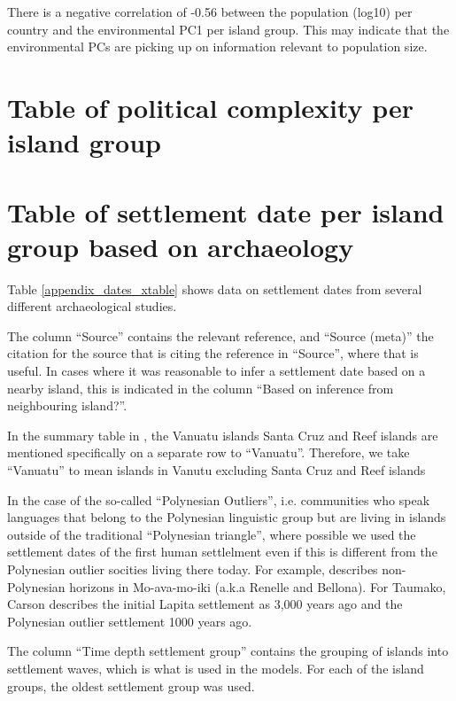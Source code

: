\documentclass[unnumsec,webpdf,modern,medium]{oup-authoring-template}
\begin{document}
\begin{appendices}
There is a negative correlation of -0.56 between the population (log10) per country and the environmental PC1 per island group. This may indicate that the environmental PCs are picking up on information relevant to population size.

\FloatBarrier

\section{Table of political complexity per island group }
\singlespacing
\label{appendix_pol_complex}




\section{Table of settlement date per island group based on archaeology}
\singlespacing
\label{dates_table_appendix}

Table \ref{appendix_dates_xtable} shows data on settlement dates from several different archaeological studies. 

The column ``Source'' contains the relevant reference, and ``Source (meta)'' the citation for the source that is citing the reference in ``Source'', where that is useful. In cases where it was reasonable to infer a settlement date based on a nearby island, this is indicated in the column ``Based on inference from neighbouring island?''.

In the summary table in \citet{rieth_cochrane_2018},  the Vanuatu islands Santa Cruz and Reef islands are mentioned specifically on a separate row to ``Vanuatu''. Therefore, we take ``Vanuatu'' to mean islands in Vanutu excluding Santa Cruz and Reef islands 

In the case of the so-called ``Polynesian Outliers'', i.e. communities who speak languages that belong to the Polynesian linguistic group but are living in islands outside of the traditional ``Polynesian triangle'', where possible we used the settlement dates of the first human settlelment even if this is different from the Polynesian outlier socities living there today. For example, \citet{carson2012recent} describes non-Polynesian horizons in Mo-ava-mo-iki (a.k.a Renelle and Bellona). For Taumako, Carson describes the initial Lapita settlement as 3,000 years ago and the Polynesian outlier settlement 1000 years ago.

The column ``Time depth settlement group'' contains the grouping of islands into settlement waves, which is what is used in the models. For each of the island groups, the oldest settlement group was used.


\end{appendices}
\end{document}

